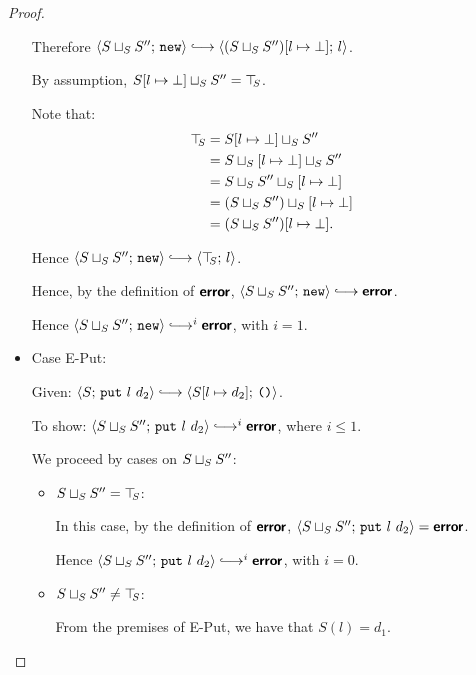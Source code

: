 \begin{proof}
\begin{itemize}
      Therefore $\config{\lubstore{S}{S''}}{\NEW} \parstepsto
      \config{\extSRaw{(\lubstore{S}{S''})}{l}{\bot}}{l}$.

      By assumption, $S[l \mapsto \bot] \sqcup_{S} S''
      = \top\hspace{-0.85mm}_{S}$.

      Note that:
      \begin{align*}
        \top\hspace{-0.85mm}_{S} &= S[l \mapsto \bot] \sqcup_{S} S'' \\ &=
        S \sqcup_{S} \left[ l \mapsto \bot \right] \sqcup_{S} S''
        \\ &=
        S \sqcup_{S} S'' \sqcup_{S} \left[ l \mapsto \bot \right]
        \\ &=
        (S \sqcup_{S} S'') \sqcup_{S} \left[ l \mapsto \bot \right]
        \\ &= (S \sqcup_{S} S'')[l \mapsto \bot] .
      \end{align*}

      Hence $\config{\lubstore{S}{S''}}{\NEW} \parstepsto
      \config{\topS}{l}$.

      Hence, by the definition of $\textbf{\textsf{error}}$,
      $\config{\lubstore{S}{S''}}{\NEW} \parstepsto \error$.

      Hence $\config{\lubstore{S}{S''}}{\NEW} \parstepsto^i \error$,
      with $i = 1$.

    \item Case {\sc E-Put}:

      Given: $\config{S}{\putexp{l}{d_2}} \parstepsto
      \config{\extSRaw{S}{l}{d_2}}{\unit}$.

      To show: $\config{\lubstore{S}{S''}}{\putexp{l}{d_2}}
      \parstepsto^i \error$, where $i \leq 1$.

      We proceed by cases on $S \sqcup_{S} S''$:

      \begin{itemize}

        \item $S \sqcup_{S} S'' = \top\hspace{-0.85mm}_{S}$:

          In this case, by the definition of $\textbf{\textsf{error}}$,
          $\langle S \sqcup_{S} S'';\, \mbox{\texttt{put}}~l~d_2 \rangle = \textbf{\textsf{error}}$.

          Hence $\config{\lubstore{S}{S''}}{\putexp{l}{d_2}}
          \parstepsto^i \error$, with $i = 0$.

        \item $S \sqcup_{S} S'' \neq \top\hspace{-0.85mm}_{S}$:

          From the premises of {\sc E-Put}, we have that $S(l) = d_1$.


\end{itemize}
\end{itemize}
\end{proof}
